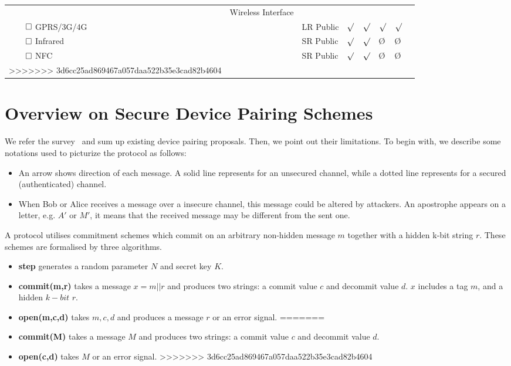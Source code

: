 \begin{table}[ht]
{\begin{tabular}{ p{3.5cm} p{3cm} l | l l l l l }
\begin{tabular}{ p{3.5cm} p{3cm} l | l l l l }
Wireless-based Methods & Wireless Interface & & & & &  \\ 
$\qed$ GPRS/3G/4G & & LR Public & $\surd$ &$\surd$ & $\surd$ & $\surd$  \\
$\qed$ Infrared & & SR Public & $\surd$ & $\surd$ & \O & \O \\ 
$\qed$ NFC & & SR Public & $\surd$ & $\surd$ & \O& \O \\ \hline
>>>>>>> 3d6cc25ad869467a057daa522b35e3cad82b4604
\end{tabular}
}
\end{table}

\section{Overview on Secure Device Pairing Schemes}

We refer the survey~\cite{6687314} and sum up existing device pairing proposals. Then, we point out their limitations. To begin with, we describe some notations used to picturize the protocol as follows:

\begin{itemize}
\item An arrow shows direction of each message. A solid line represents for an unsecured channel, while a dotted line represents for a secured (authenticated) channel. 
\item When Bob or Alice receives a message over a insecure channel, this message could be altered by attackers. An apostrophe appears on a letter, e.g. $A'$ or $M'$, it means that the received message may be different from the sent one. 
\end{itemize}

A protocol utilises commitment schemes which commit on an arbitrary non-hidden message $m$ together with a hidden k-bit string $r$. These schemes are formalised by three algorithms.

\begin{itemize}
<<<<<<< HEAD
\item \textbf{step} generates a random parameter $N$ and secret key $K$.
\item \textbf{commit(m,r)} takes a message $x= m || r$ and produces two strings: a commit value $c$ and decommit value $d$. $x$ includes a tag $m$, and a hidden $k-bit$ $r$.
\item \textbf{open(m,c,d)} takes $m,c,d$ and produces a message $r$ or an error signal. 
=======
\item \textbf{commit(M)} takes a message $M$ and produces two strings: a commit value $c$ and decommit value $d$. 
\item \textbf{open(c,d)} takes $M$ or  an error signal. 
>>>>>>> 3d6cc25ad869467a057daa522b35e3cad82b4604
\end{itemize} 

